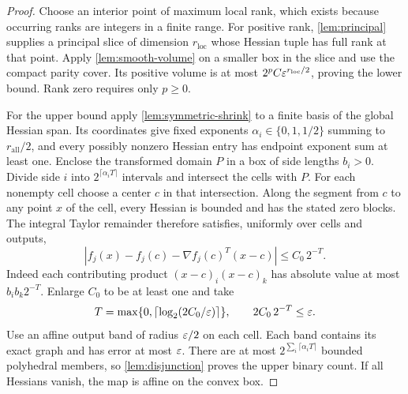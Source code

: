 \begin{proof}
Choose an interior point of maximum local rank, which exists because
occurring ranks are integers in a finite range. For positive rank,
\cref{lem:principal} supplies a principal slice of dimension
$r_{\mathrm{loc}}$ whose Hessian tuple has full rank at that point.
Apply \cref{lem:smooth-volume} on a smaller box in the slice and use
the compact parity cover. Its positive volume is at most
$2^pC\varepsilon^{r_{\mathrm{loc}}/2}$, proving the lower bound. Rank zero
requires only $p\ge0$.

For the upper bound apply \cref{lem:symmetric-shrink} to a finite
basis of the global Hessian span. Its coordinates give fixed exponents
$\alpha_i\in\{0,1,1/2\}$ summing to $r_{\mathrm{all}}/2$, and every
possibly nonzero Hessian entry has endpoint exponent sum at least one.
Enclose the transformed domain $P$ in a box of side lengths $b_i>0$.
Divide side $i$ into $2^{\lceil\alpha_iT\rceil}$ intervals and intersect
the cells with $P$. For each nonempty cell choose a center $c$ in that
intersection. Along the segment from $c$ to any point $x$ of the cell,
every Hessian is bounded and has the stated zero blocks. The integral
Taylor remainder therefore satisfies, uniformly over cells and outputs,
\[
 |f_j(x)-f_j(c)-\nabla f_j(c)^T(x-c)|\le C_0\,2^{-T}.
\]
Indeed each contributing product $(x-c)_i(x-c)_k$ has absolute value
at most $b_i b_k2^{-T}$. Enlarge $C_0$ to be at least one and take
\[
 T=\max\{0,\lceil\log_2(2C_0/\varepsilon)\rceil\},
 \qquad 2C_0\,2^{-T}\le\varepsilon.
\]
Use an affine
output band of radius $\varepsilon/2$ on each cell. Each band contains its
exact graph and has error at most $\varepsilon$. There are at most
$2^{\sum_i\lceil\alpha_iT\rceil}$ bounded polyhedral members, so
\cref{lem:disjunction} proves the upper binary count. If all Hessians
vanish, the map is affine on the convex box.


\end{proof}
